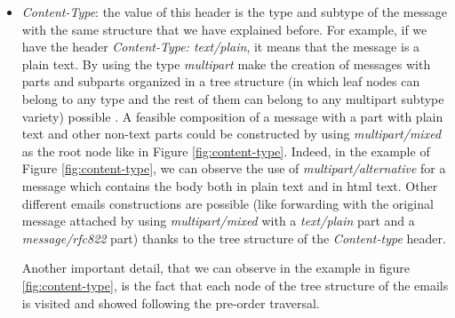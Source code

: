\begin{itemize}
	\item\textit{Content-Type}: the value of this header is the type and subtype of the message with the same structure that we have explained before. For example, if we have the header \textit{Content-Type: text/plain}, it means that the message is a plain text. By using the type \textit{multipart} make the creation of messages with parts and subparts organized in a tree structure (in which leaf nodes can belong to any type and the rest of them can belong to any multipart subtype variety) possible \citep[Section 7.2]{rfc1341}. A feasible composition of a message with a part with plain text and other non-text parts could be constructed by using \textit{multipart/mixed} as the root node like in Figure \ref{fig:content-type}. Indeed, in the example of Figure \ref{fig:content-type}, we can observe the use of \textit{multipart/alternative} for a message which contains the body both in plain text and in html text. Other different emails constructions are possible (like forwarding with the original message attached by using \textit{multipart/mixed} with a \textit{text/plain} part and a \textit{message/rfc822} part) thanks to the tree structure of the \textit{Content-type} header.
	
	Another important detail, that we can observe in the example in figure \ref{fig:content-type}, is the fact that each node of the tree structure of the emails is visited and showed following the pre-order traversal.
	

\end{itemize}
